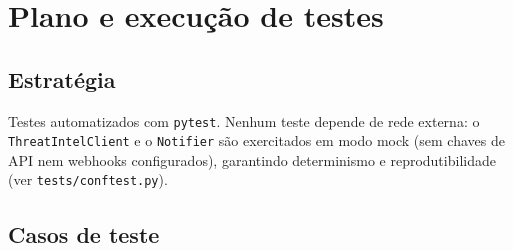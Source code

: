 \documentclass[11pt,a4paper]{article}
\begin{document}
\section{Plano e execução de testes}

\subsection{Estratégia}

Testes automatizados com \texttt{pytest}. Nenhum teste depende de rede externa: o
\texttt{ThreatIntelClient} e o \texttt{Notifier} são exercitados em modo mock (sem
chaves de API nem webhooks configurados), garantindo determinismo e reprodutibilidade
(ver \texttt{tests/conftest.py}).

\subsection{Casos de teste}
\end{document}
